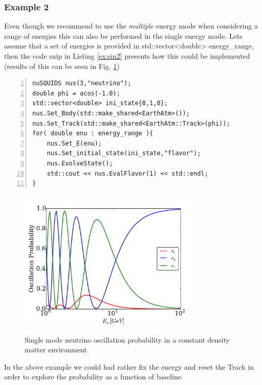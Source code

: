 \documentclass[3p,12pt,authoryear]{elsarticle}
\newcommand{\ttf}{\ttfamily}
\begin{document}
\subsubsection{Example 2}

Even though we recommend to use the {\it multiple} energy mode when considering a range of energies
this can also be performed in the single energy mode. Lets assume that a set of energies is provided in 
{\ttf std::vector<double> energy\_range}, then the code snip in Listing \ref{ex:sin2} presents how this could be implemented (results of this can be seen in Fig. \ref{fig:atmo_osc})

\begin{lstlisting}[frame=leftline, numbers = left,breaklines=true, label = ex:sin2 ]
nuSQUIDS nus(3,"neutrino");
double phi = acos(-1.0);
std::vector<double> ini_state{0,1,0};
nus.Set_Body(std::make_shared<EarthAtm>());
nus.Set_Track(std::make_shared<EarthAtm::Track>(phi));
for( double enu : energy_range ){
	nus.Set_E(enu);
	nus.Set_initial_state(ini_state,"flavor");
	nus.EvolveState();
	std::cout << nus.EvalFlavor(1) << std::endl;
}
\end{lstlisting}

\begin{figure}[h]
\begin{center}
\label{fig:atmo_osc}
\includegraphics[width=0.8\textwidth]{../fig/earth_oscillation.pdf}
\caption{Single mode neutrino oscillation probability in a constant density matter environment.}
\end{center}
\end{figure}

In the above example we could had rather fix the energy and reset the {\ttf Track} in order to explore the probability as a function of baseline. 
\end{document}
